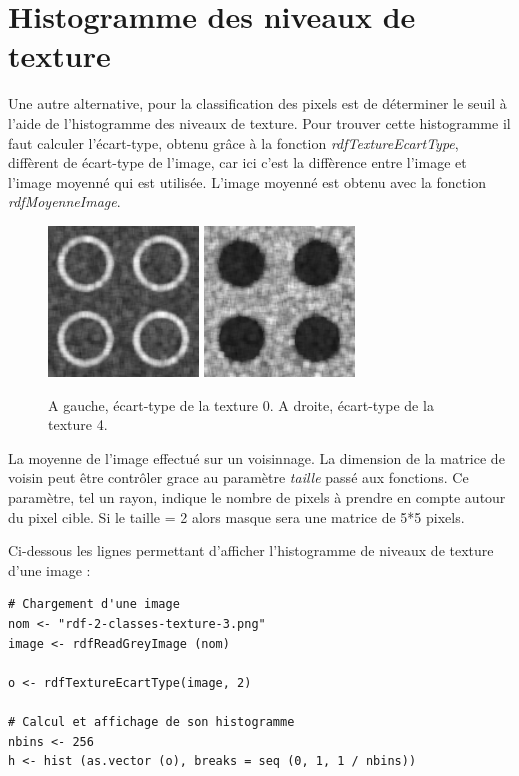 \documentclass[11pt]{article}
\begin{document}
  \section{Histogramme des niveaux de texture}
  
  Une autre alternative, pour la classification des pixels est de déterminer le seuil à l'aide de 
  l'histogramme des niveaux de texture. Pour trouver cette histogramme il faut calculer l'écart-type,
  obtenu grâce à la fonction \textit{rdfTextureEcartType}, diffèrent de écart-type de l'image, car ici 
  c'est la diffèrence entre l'image et l'image moyenné qui est utilisée. L'image moyenné est obtenu avec 
  la fonction \textit{rdfMoyenneImage}.\\
  
  \begin{figure}[H]
    \center
    \includegraphics[width=4cm]{texture-0/texture-0-5-ecart-type.png}
    \includegraphics[width=4cm]{texture-4/texture-4-5-ecart-type.png}
    \caption{A gauche, écart-type de la texture 0. A droite, écart-type de la texture 4.}
  \end{figure}
  
  La moyenne de l'image effectué sur un voisinnage. La dimension de la matrice de voisin peut être contrôler 
  grace au paramètre \textit{taille} passé aux fonctions. Ce paramètre, tel un rayon, indique le nombre de 
  pixels à prendre en compte autour du pixel cible. Si le taille = 2 alors masque sera une matrice de 5*5 
  pixels.\\
  
  \newpage
  
  Ci-dessous les lignes permettant d'afficher l'histogramme de niveaux de texture d'une image :
  \begin{lstlisting}[caption=Afficher l'histogramme de niveaux de texture d'une image]
# Chargement d'une image
nom <- "rdf-2-classes-texture-3.png"
image <- rdfReadGreyImage (nom)

o <- rdfTextureEcartType(image, 2)

# Calcul et affichage de son histogramme
nbins <- 256
h <- hist (as.vector (o), breaks = seq (0, 1, 1 / nbins))\end{lstlisting}
  
\end{document}
